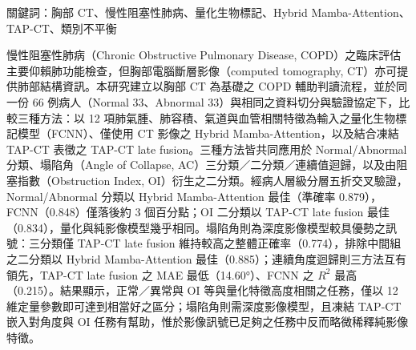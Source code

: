 \begin{ZhAbstract}
    \begin{ZhAbstractItems}
        \noindent \text 關鍵詞：胸部 CT、慢性阻塞性肺病、量化生物標記、Hybrid Mamba-Attention、TAP-CT、類別不平衡

    \end{ZhAbstractItems}

    \begin{ZhAbstractDescription}
        慢性阻塞性肺病（Chronic Obstructive Pulmonary Disease, COPD）之臨床評估主要仰賴肺功能檢查，但胸部電腦斷層影像（computed tomography, CT）亦可提供肺部結構資訊。本研究建立以胸部 CT 為基礎之 COPD 輔助判讀流程，並於同一份 66 例病人（Normal 33、Abnormal 33）與相同之資料切分與驗證協定下，比較三種方法：以 12 項肺氣腫、肺容積、氣道與血管相關特徵為輸入之量化生物標記模型（FCNN）、僅使用 CT 影像之 Hybrid Mamba-Attention，以及結合凍結 TAP-CT 表徵之 TAP-CT late fusion。三種方法皆共同應用於 Normal/Abnormal 分類、塌陷角（Angle of Collapse, AC）三分類／二分類／連續值迴歸，以及由阻塞指數（Obstruction Index, OI）衍生之二分類。經病人層級分層五折交叉驗證，Normal/Abnormal 分類以 Hybrid Mamba-Attention 最佳（準確率 0.879），FCNN（0.848）僅落後約 3 個百分點；OI 二分類以 TAP-CT late fusion 最佳（0.834），量化與純影像模型幾乎相同。塌陷角則為深度影像模型較具優勢之訊號：三分類僅 TAP-CT late fusion 維持較高之整體正確率（0.774），排除中間組之二分類以 Hybrid Mamba-Attention 最佳（0.885）；連續角度迴歸則三方法互有領先，TAP-CT late fusion 之 MAE 最低（14.60°）、FCNN 之 \(R^2\) 最高（0.215）。結果顯示，正常／異常與 OI 等與量化特徵高度相關之任務，僅以 12 維定量參數即可達到相當好之區分；塌陷角則需深度影像模型，且凍結 TAP-CT 嵌入對角度與 OI 任務有幫助，惟於影像訊號已足夠之任務中反而略微稀釋純影像特徵。
    \end{ZhAbstractDescription}
    
\end{ZhAbstract}
